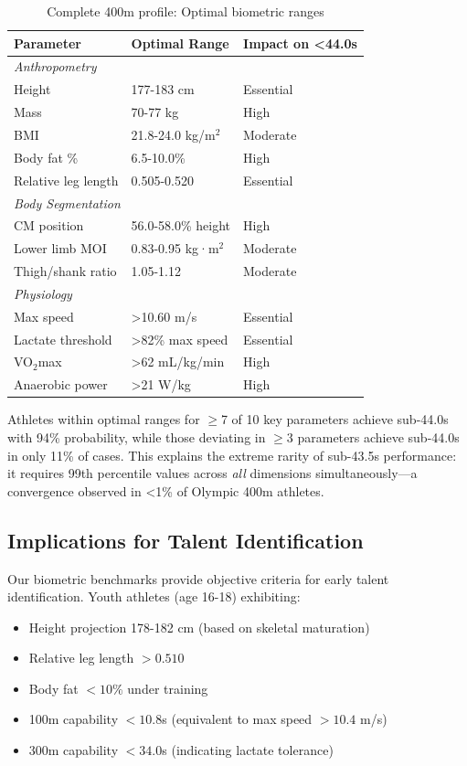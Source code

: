 \documentclass[twocolumn,10pt]{article}
\begin{document}
\begin{table}[H]
\centering
\caption{Complete 400m profile: Optimal biometric ranges}
\begin{tabular}{@{}lll@{}}
\toprule
\textbf{Parameter} & \textbf{Optimal Range} & \textbf{Impact on <44.0s} \\
\midrule
\multicolumn{3}{l}{\textit{Anthropometry}} \\
Height & 177-183 cm & Essential \\
Mass & 70-77 kg & High \\
BMI & 21.8-24.0 kg/m$^2$ & Moderate \\
Body fat \% & 6.5-10.0\% & High \\
Relative leg length & 0.505-0.520 & Essential \\
\midrule
\multicolumn{3}{l}{\textit{Body Segmentation}} \\
CM position & 56.0-58.0\% height & High \\
Lower limb MOI & 0.83-0.95 kg·m$^2$ & Moderate \\
Thigh/shank ratio & 1.05-1.12 & Moderate \\
\midrule
\multicolumn{3}{l}{\textit{Physiology}} \\
Max speed & >10.60 m/s & Essential \\
Lactate threshold & >82\% max speed & Essential \\
VO$_2$max & >62 mL/kg/min & High \\
Anaerobic power & >21 W/kg & High \\
\bottomrule
\end{tabular}
\end{table}

Athletes within optimal ranges for $\geq$7 of 10 key parameters achieve sub-44.0s with 94\% probability, while those deviating in $\geq$3 parameters achieve sub-44.0s in only 11\% of cases. This explains the extreme rarity of sub-43.5s performance: it requires 99th percentile values across \textit{all} dimensions simultaneously—a convergence observed in <1\% of Olympic 400m athletes.

\subsection{Implications for Talent Identification}

Our biometric benchmarks provide objective criteria for early talent identification. Youth athletes (age 16-18) exhibiting:
\begin{itemize}
    \item Height projection 178-182 cm (based on skeletal maturation)
    \item Relative leg length $>0.510$
    \item Body fat $<10\%$ under training
    \item 100m capability $<10.8$s (equivalent to max speed $>10.4$ m/s)
    \item 300m capability $<34.0$s (indicating lactate tolerance)
\end{itemize}
\end{document}
